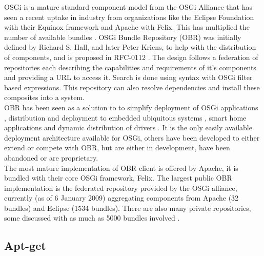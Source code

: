 OSGi is a 
mature standard component model from the OSGi Alliance that has seen a recent uptake in industry \cite{kriens_osgi_2008} 
from organizations like the Eclipse Foundation with their Equinox framework and Apache with Felix. This has multiplied the 
number of available bundles \cite{the_osgi_alliance_rfc-0112_2006}. OSGi Bundle Repository (OBR) was initially defined by 
Richard S. Hall, and later Peter Kriens, to help with the distribution of components, and is proposed in 
RFC-0112 \cite{the_osgi_alliance_rfc-0112_2006}. The design follows a federation of repositories each describing 
the capabilities and requirements of it's components and providing a URL to access it. Search is done using syntax with OSGi filter 
based expressions. This repository can also resolve dependencies and install these composites into a system. \\
OBR has been seen as a solution to to simplify deployment of OSGi applications
\cite{jung_integrating_2007}, distribution and deployment to embedded
ubiquitous systems \cite{jung_embedded_2006}, smart home applications \cite{gouin-vallerand_managing_2007} and 
dynamic distribution of drivers \cite{kriens_osgi_2008}. It is the only easily available deployment 
architecture available for OSGi, others have been developed to either extend or compete \cite{frnot_component_2005} with OBR, 
but are either in development, have been abandoned or are proprietary.\\ 
The most mature implementation of OBR client is offered by Apache, it is bundled with their core OSGi framework, Felix. 
The largest public OBR implementation is the federated repository provided by the OSGi alliance,
currently (as of 6 January 2009) aggregating components from Apache (32 bundles) and Eclipse (1534 bundles).
There are also many private repositories, some discussed with as much as 5000 bundles involved \cite{kriens_osgi_2008}.\\  


\subsection{Apt-get}

